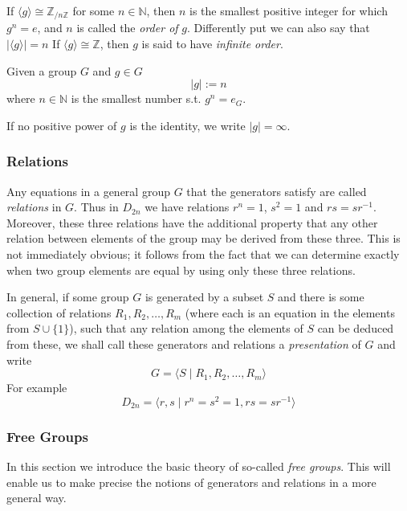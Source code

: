 If \(\langle g \rangle \cong \mathbb{Z}_{/n\mathbb{Z}}\) for some \(n \in \mathbb{N}\), then \(n\) is the smallest positive integer for which \(g^n = e\), and \(n\) is called the \emph{order of} \(g\).
Differently put we can also say that \(|\langle g \rangle| = n\)
If \(\langle g \rangle \cong \mathbb{Z}\), then \(g\) is said to have \emph{infinite order}.

\begin{definition}
   Given a group \(G\) and \(g \in G\)
   \[|g| := n\]
   where \(n \in \mathbb{N}\) is the smallest number s.t. \(g^n = e_G\).
\end{definition}
\begin{remark}[Notation]
   If no positive power of \(g\) is the identity, we write \(|g| = \infty\).
\end{remark}

\subsubsection{Relations}
Any equations in a general group \(G\) that the generators satisfy are called \emph{relations} in \(G\).
Thus in \(D_{2n}\) we have relations \(r^n = 1\), \(s^2 = 1\) and \(rs = sr^{-1}\).
Moreover, these three relations have the additional property that any other relation between elements of the group may be derived from these three.
This is not immediately obvious; it follows from the fact that we can determine exactly when two group elements are equal by using only these three relations.

In general, if some group \(G\) is generated by a subset \(S\) and there is some collection of relations \(R_1, R_2, \ldots, R_m\) (where each is an equation in the elements from \(S \cup \{1\}\)), such that any relation among the elements of \(S\) can be deduced from these, we shall call these generators and relations a \emph{presentation} of \(G\) and write
\[G = \langle S \mid R_1, R_2, \ldots, R_m \rangle\]
For example
\[D_{2n} = \langle r, s \mid r^n = s^2 = 1, rs = sr^{-1}\rangle\]

\subsubsection{Free Groups}
In this section we introduce the basic theory of so-called \emph{free groups}.
This will enable us to make precise the notions of generators and relations in a more general way.

